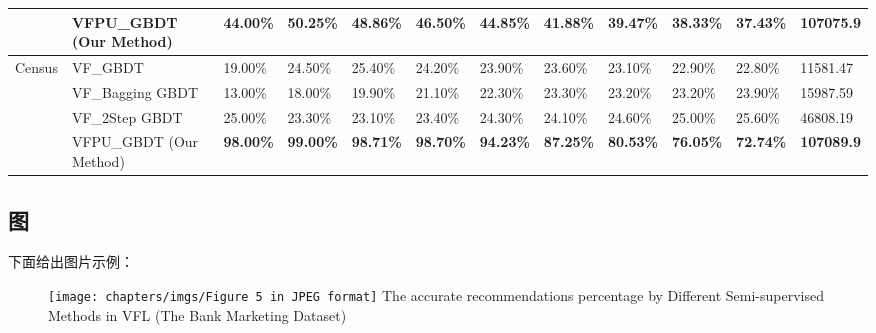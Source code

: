 \begin{table}
{{\begin{tabular}{llllllllllll}
							& VFPU\_GBDT (Our Method) & \textbf{44.00\%} & \textbf{50.25\%} & \textbf{48.86\%} & \textbf{46.50\%} & \textbf{44.85\%} & \textbf{41.88\%} & \textbf{39.47\%} & \textbf{38.33\%} & \textbf{37.43\%} & \textbf{107075.9}  \\ 
	\hline
	\multirow{4}{*}{Census} & VF\_GBDT                & 19.00\%          & 24.50\%          & 25.40\%          & 24.20\%          & 23.90\%          & 23.60\%          & 23.10\%          & 22.90\%          & 22.80\%          & 11581.47           \\
							& VF\_Bagging GBDT        & 13.00\%          & 18.00\%          & 19.90\%          & 21.10\%          & 22.30\%          & 23.30\%          & 23.20\%          & 23.20\%          & 23.90\%          & 15987.59           \\
							& VF\_2Step GBDT          & 25.00\%          & 23.30\%          & 23.10\%          & 23.40\%          & 24.30\%          & 24.10\%          & 24.60\%          & 25.00\%          & 25.60\%          & 46808.19           \\
							& VFPU\_GBDT (Our Method) & \textbf{98.00\%} & \textbf{99.00\%} & \textbf{98.71\%} & \textbf{98.70\%} & \textbf{94.23\%} & \textbf{87.25\%} & \textbf{80.53\%} & \textbf{76.05\%} & \textbf{72.74\%} & \textbf{107089.9}  \\
	\hline
	\end{tabular}
		}
	}
\end{table}







\subsection{图}
下面给出图片示例：


\begin{figure}[h]
		\centering 
		\texttt{[image: chapters/imgs/Figure 5 in JPEG format]}
		{\wuhao The accurate recommendations percentage by Different Semi-supervised Methods in VFL (The Bank Marketing Dataset)}
	   	 \label{fig:GBDT}
\end{figure}





